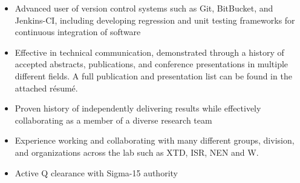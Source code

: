 \begin{center}
\begin{minipage}{\textwidth}
\begin{itemize}[leftmargin=.45in,rightmargin=.45in,itemsep=1.6mm]
	\item Advanced user of version control systems such as Git, BitBucket, and Jenkins-CI, including developing regression and unit testing frameworks for continuous integration of software

	\item Effective in technical communication, demonstrated through a history of accepted abstracts, publications, and conference presentations in multiple different fields. A full publication and presentation list can be found in the attached r\'{e}sum\'{e}.

	\item Proven history of independently delivering results while effectively collaborating as a member of a diverse research team

	\item Experience working and collaborating with many different groups, division, and organizations across the lab such as XTD, ISR, NEN and W.

	\item Active Q clearance with Sigma-15 authority
	
		
	



\end{itemize}
\end{minipage}
\end{center}
